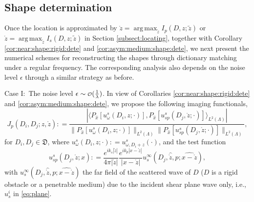 \documentclass[a4paper,11pt]{article}
\DeclareMathOperator*{\argmax}{arg\,max}
\newcommand\smallO{
  \mathchoice
    {{\scriptstyle\mathcal{O}}}%
    {{\scriptstyle\mathcal{O}}}%
    {{\scriptscriptstyle\mathcal{O}}}%
    {\scalebox{.7}{$\scriptscriptstyle\mathcal{O}$}}%
  }
\theoremstyle{remark}
\theoremstyle{definition}
\numberwithin{equation}{section}
\begin{document}
\subsection{Shape determination}
Once the location is approximated by $\mathring{z}= \argmax_{\tilde{z}}I_{p}(D,z;\tilde{z})$ or $\mathring{z}= \argmax_{\tilde{z}}I_{s}(D,z;\tilde{z})$ in Section \ref{subsect:locating}, together with Corollary \ref{cor:near:shape:rigid:dete} and \ref{cor:asym:medium:shape:dete}, we next present the numerical schemes for reconstructing the shapes through dictionary matching under a regular frequency. The corresponding analysis also depends on the noise level $\epsilon$ through a similar strategy as before.

\medskip

Case I:~The noise level $\epsilon \sim \smallO (\frac{1}{\lambda})$.
In view of Corollaries \ref{cor:near:shape:rigid:dete} and \ref{cor:asym:medium:shape:dete}, we propose the following imaging functionals,
\begin{equation}\label{eq:indicator:p:multi}
J_{p}(D_i, D_j; z, \mathring{z}): = \frac{|\langle P_{\hat{x}}[u_{\omega}^s(D_i,z;\cdot)], P_{\hat{x}}[u_{sp}^s(D_j,\mathring{z};\cdot)]\rangle_{L^{2}(\Lambda)} |}{\|P_{\hat{x}}[u_{\omega}^s(D_i,z;\cdot)]\|_{L^2(\Lambda)} \|P_{\hat{x}}[u_{sp}^s(D_j,\mathring{z};\cdot)]\|_{L^2(\Lambda)} },
\end{equation}
for $D_i, D_j \in \mathfrak{D}$, where $u_{\omega}^s(D_i,z;\cdot): = u_{\omega, D_i+z}^{s}(\cdot)$, and the test function
\begin{equation}\label{eq:shape:sp:p}
u_{sp}^s(D_j,\mathring{z};x): =  \frac{e^{ik_s|\mathring{z}|}}{4\pi |\mathring{z}|} \frac{e^{ik_p|x-\mathring{z}|}}{|x-\mathring{z}|}u_{s}^{\infty}(D_j,\hat{\mathring{z}},p;\widehat{x-\mathring{z}}),
\end{equation}
with $u_{s}^{\infty}(D_j,\hat{\mathring{z}},p;\widehat{x-\mathring{z}})$ the far field of the scattered wave of $D$ ($D$ is a rigid obstacle or a penetrable medium) due to the incident shear plane wave only, i.e., $u_{s}^i$ in \eqref{eq:plane}.
%
\end{document}
